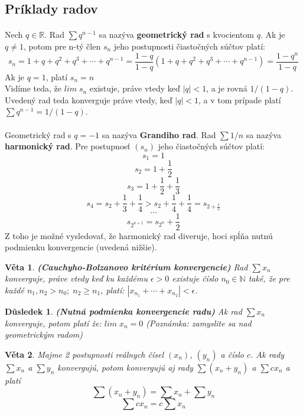 \documentclass[12pt,a4paper]{article}
\newtheorem{sentence}{Věta}
\newtheorem{result}{Důsledek}
\begin{document}
\subsection{Príklady radov}
\paragraph{}
Nech $q\in \mathds{R}$. Rad $\sum q^{n-1}$ sa nazýva \textbf{geometrický rad} s kvocientom $q$. Ak je $q\neq 1$, potom pre n-tý člen $s_{n}$ jeho postupnosti čiastočných súčtov platí:$$s_{n}=1+q+q^{2}+q^{3}+\dotsm + q^{n-1}=\frac{1-q}{1-q}(1+q+q^{2}+q^{3}+\dotsm + q^{n-1}) = \frac{1-q^{n}}{1-q}$$
Ak je $q=1$, platí $s_{n}=n$\\
Vidíme teda, že $lim \; s_{n}$ existuje, práve vtedy keď $|q| < 1$, a je rovná $1/(1-q)$. Uvedený rad teda konverguje práve vtedy, keď $|q| < 1$, a v tom prípade platí $\sum q^{n-1}=1/(1-q)$. \paragraph{} Geometrický rad s $q=-1$ sa nazýva \textbf{Grandiho rad}. Rad $\sum 1/n$ sa nazýva \textbf{harmonický rad}. Pre postupnosť $(s_{n})$ jeho čiastočných súčtov platí: $$s_{1}=1$$$$s_{2}=1+\frac{1}{2}$$$$s_{3}=1+\frac{1}{2}+\frac{1}{3}$$$$s_{4}=s_{2}+\frac{1}{3}+\frac{1}{4}>s_{2}+\frac{1}{4}+\frac{1}{4}=s_{2+\frac{1}{2}}$$$$\dotso$$$$s_{2^{n+1}}=s_{2^{n}}+\frac{1}{2}$$
Z toho je možné vysledovať, že harmonický rad diveruje, hoci spĺňa nutnú podmienku konvergencie (uvedená nižšie).

\begin{sentence}
	\textbf{(Cauchyho-Bolzanovo kritérium konvergencie)} Rad $\sum x_{n}$ konverguje, práve vtedy keď ku každému $\epsilon >0$ existuje číslo $n_{0}\in \mathds{N}$ také, že pre každé $n_{1}, n_{2}>n_{0}; \; n_{2}\geq n_{1}$, platí: $|x_{n_{1}}+\dotsm +x_{n_{2}}|<\epsilon$.
\end{sentence}

\begin{result}
	\textbf{(Nutná podmienka konvergencie radu)} Ak rad $\sum x_{n}$ konverguje, potom platí že: $lim \; x_{n}=0$ (Poznámka: zamyslite sa nad geometrickým radom)
\end{result}

\begin{sentence}
	Majme 2 postupnosti reálnych čísel $(x_{n})$, $(y_{n})$ a číslo $c$. Ak rady $\sum x_{n}$ a $\sum y_{n}$ konvergujú, potom konvergujú aj rady $\sum (x_{n}+y_{n})$ a $\sum cx_{n}$ a platí $$\sum (x_{n}+y_{n})=\sum x_{n} + \sum y_{n}$$ $$\sum cx_{n}=c\sum x_{n}$$
\end{sentence}
\end{document}
